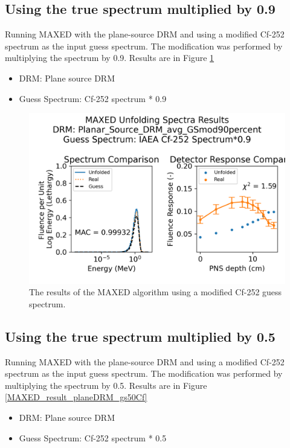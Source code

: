 \subsection*{Using the true spectrum multiplied by 0.9}
Running MAXED with the plane-source DRM and using a modified Cf-252 spectrum as the input guess spectrum. The modification was performed by multiplying the spectrum by 0.9. Results are in Figure \ref{MAXED_result_planeDRM_gs90Cf}
\begin{itemize}
\item DRM: Plane source DRM
\item Guess Spectrum: Cf-252 spectrum * 0.9
\end{itemize}

\begin{figure}[htb]
  \centering
  \includegraphics[scale=0.8]{images/Planar_Source_DRM_avg_GSmod90percent_IAEA Cf-252 Spectrum_0.png}
  \caption{The results of the MAXED algorithm using a modified Cf-252 guess spectrum.} \label{MAXED_result_planeDRM_gs90Cf}
\end{figure}

\subsection*{Using the true spectrum multiplied by 0.5}
Running MAXED with the plane-source DRM and using a modified Cf-252 spectrum as the input guess spectrum. The modification was performed by multiplying the spectrum by 0.5. Results are in Figure \ref{MAXED_result_planeDRM_gs50Cf}
\begin{itemize}
\item DRM: Plane source DRM
\item Guess Spectrum: Cf-252 spectrum * 0.5
\end{itemize}

